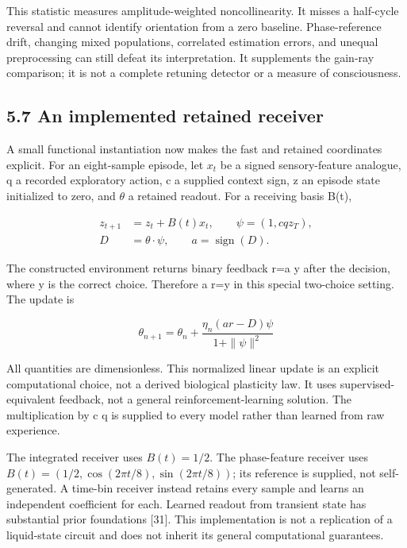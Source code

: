 \documentclass[
  american,
  11pt,
  letterpaper,
]{article}
\begin{document}
This statistic measures amplitude-weighted noncollinearity. It misses a half-cycle reversal and cannot identify orientation from a zero baseline. Phase-reference drift, changing mixed populations, correlated estimation errors, and unequal preprocessing can still defeat its interpretation. It supplements the gain-ray comparison; it is not a complete retuning detector or a measure of consciousness.

\subsection{5.7 An implemented retained receiver}\label{an-implemented-retained-receiver}

A small functional instantiation now makes the fast and retained coordinates explicit. For an eight-sample episode, let \(x_t\) be a signed sensory-feature analogue, q a recorded exploratory action, c a supplied context sign, z an episode state initialized to zero, and \(\theta\) a retained readout. For a receiving basis B(t),

\begin{equation}
\begin{aligned}z_{t+1}&=z_t+B(t)x_t,\qquad\psi=(1,cqz_T),\\ D&=\theta\mathbin{\cdot}\psi,\qquad a=\operatorname{sign}(D).\end{aligned}\tag{11}
\end{equation}

The constructed environment returns binary feedback r=a y after the decision, where y is the correct choice. Therefore a r=y in this special two-choice setting. The update is

\begin{equation}
\theta_{n+1}=\theta_n+\frac{\eta_n(ar-D)\psi}{1+\|\psi\|^2}\tag{12}
\end{equation}

All quantities are dimensionless. This normalized linear update is an explicit computational choice, not a derived biological plasticity law. It uses supervised-equivalent feedback, not a general reinforcement-learning solution. The multiplication by c q is supplied to every model rather than learned from raw experience.

The integrated receiver uses \(B(t)=1/2\). The phase-feature receiver uses \(B(t)=(1/2,\cos(2\pi t/8),\sin(2\pi t/8))\); its reference is supplied, not self-generated. A time-bin receiver instead retains every sample and learns an independent coefficient for each. Learned readout from transient state has substantial prior foundations {[}31{]}. This implementation is not a replication of a liquid-state circuit and does not inherit its general computational guarantees.
\end{document}
